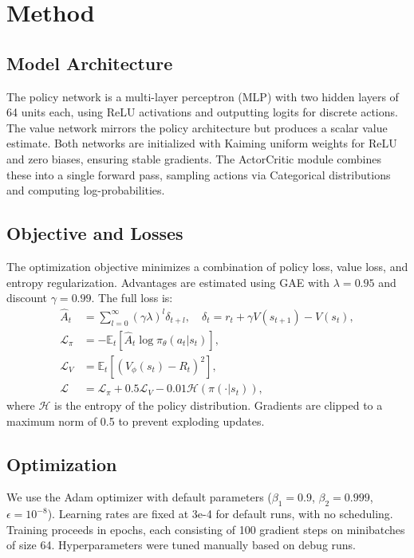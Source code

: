 \documentclass[11pt]{article}
\begin{document}
\section{Method}
\subsection{Model Architecture}
The policy network is a multi-layer perceptron (MLP) with two hidden layers of 64 units each, using ReLU activations and outputting logits for discrete actions. The value network mirrors the policy architecture but produces a scalar value estimate. Both networks are initialized with Kaiming uniform weights for ReLU and zero biases, ensuring stable gradients. The ActorCritic module combines these into a single forward pass, sampling actions via Categorical distributions and computing log-probabilities.

\subsection{Objective and Losses}
The optimization objective minimizes a combination of policy loss, value loss, and entropy regularization. Advantages are estimated using GAE with $\lambda = 0.95$ and discount $\gamma = 0.99$. The full loss is:
\begin{align}
\hat{A}_t &= \sum_{l=0}^{\infty} (\gamma \lambda)^l \delta_{t+l}, \quad \delta_t = r_t + \gamma V(s_{t+1}) - V(s_t), \\
\mathcal{L}_{\pi} &= -\mathbb{E}_t\left[\hat{A}_t \log \pi_{\theta}(a_t|s_t)\right], \\
\mathcal{L}_V &= \mathbb{E}_t\left[\left(V_{\phi}(s_t) - R_t\right)^2\right], \\
\mathcal{L} &= \mathcal{L}_{\pi} + 0.5 \mathcal{L}_V - 0.01 \mathcal{H}\left(\pi(\cdot|s_t)\right),
\end{align}
where $\mathcal{H}$ is the entropy of the policy distribution. Gradients are clipped to a maximum norm of 0.5 to prevent exploding updates.

\subsection{Optimization}
We use the Adam optimizer with default parameters ($\beta_1 = 0.9$, $\beta_2 = 0.999$, $\epsilon = 10^{-8}$). Learning rates are fixed at 3e-4 for default runs, with no scheduling. Training proceeds in epochs, each consisting of 100 gradient steps on minibatches of size 64. Hyperparameters were tuned manually based on debug runs.
\end{document}
